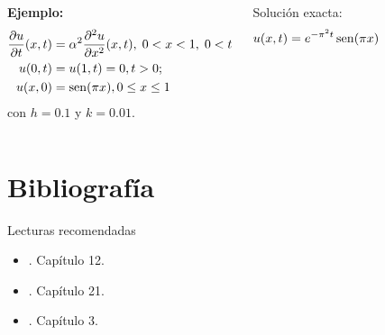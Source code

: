 \documentclass[9pt, aspectratio=169]{beamer}
\begin{document}
\begin{frame}
\begin{columns}
\cx
\textbf{Ejemplo:} 
\begin{align*}
\frac{\partial u}{\partial t} (x, t) &= \alpha^2 \frac{\partial^2 u}{\partial x^2}(x, t), \; 0 < x < 1, \; 0 < t \\
u(0, t) &= u(1, t) = 0, t > 0; \\
u(x, 0) &= \operatorname{sen}(\pi x), 0 \leq x \leq 1
\end{align*}
con $h = 0.1$ y $k = 0.01$.

Solución exacta:
\[u(x, t) = e^{-\pi^2 t} \operatorname{sen} (\pi x) \]
\end{columns}
\end{frame}






\section*{Bibliografía}
\begin{frame}[allowframebreaks]{Lecturas recomendadas}
\begin{itemize}
    \item {}. Capítulo 12.
\item {}. Capítulo 21.
    \item {}. Capítulo 3.
\end{itemize}
\end{frame}
\end{document}
